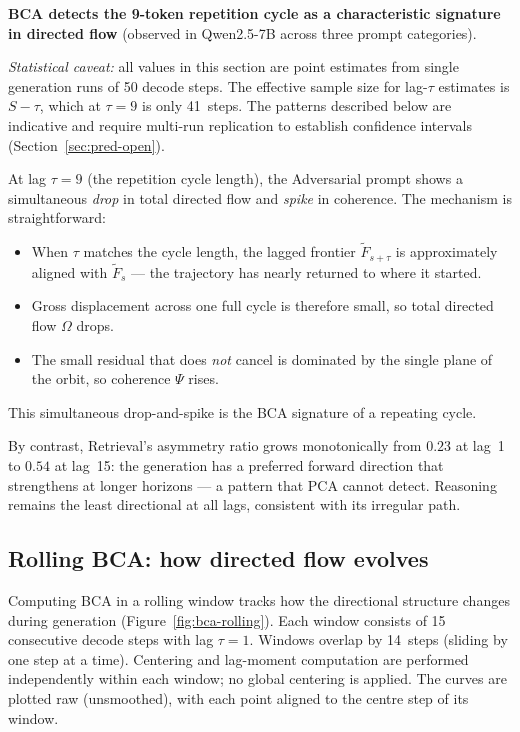 \documentclass[11pt, twoside, openright]{memoir}
\numberwithin{equation}{chapter}
\begin{document}
\begin{finding}
\textbf{BCA detects the 9-token repetition cycle as a characteristic
signature in directed flow}
(observed in Qwen2.5-7B across three prompt categories).

\emph{Statistical caveat:} all values in this section are point
estimates from single generation runs of 50 decode steps.  The
effective sample size for lag-$\tau$ estimates is $S - \tau$, which
at $\tau = 9$ is only 41~steps.  The patterns described below are
indicative and require multi-run replication to establish confidence
intervals (Section~\ref{sec:pred-open}).

\medskip
At lag $\tau = 9$ (the repetition cycle length), the Adversarial
prompt shows a simultaneous \emph{drop} in total directed flow and
\emph{spike} in coherence.  The mechanism is straightforward:
\begin{itemize}[nosep]
\item When $\tau$ matches the cycle length, the lagged frontier
  $\tilde{F}_{s+\tau}$ is approximately aligned with
  $\tilde{F}_s$ --- the trajectory has nearly returned to where it
  started.
\item Gross displacement across one full cycle is therefore small,
  so total directed flow $\Omega$ drops.
\item The small residual that does \emph{not} cancel is dominated
  by the single plane of the orbit, so coherence $\Psi$ rises.
\end{itemize}
This simultaneous drop-and-spike is the BCA signature of a
repeating cycle.

By contrast, Retrieval's asymmetry ratio grows monotonically from
$0.23$ at lag~1 to $0.54$ at lag~15: the generation has a preferred
forward direction that strengthens at longer horizons --- a
pattern that PCA cannot detect.  Reasoning remains the least
directional at all lags, consistent with its irregular path.
\end{finding}

\subsection*{Rolling BCA: how directed flow evolves}

Computing BCA in a rolling window tracks how the directional
structure changes during generation
(Figure~\ref{fig:bca-rolling}).  Each window consists of 15
consecutive decode steps with lag $\tau = 1$.  Windows overlap by
14~steps (sliding by one step at a time).  Centering and
lag-moment computation are performed independently within each
window; no global centering is applied.  The curves are plotted
raw (unsmoothed), with each point aligned to the centre step of
its window.
\end{document}
